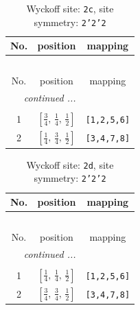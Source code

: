 \documentclass[fleqn,8pt]{jsarticle}
\begin{document}
\renewcommand{\arraystretch}{1.2}
\begin{longtable}{ccc}
\caption{Wyckoff site: {\tt 2c}, site symmetry: {\tt 2'2'2}}
 \\
 \hline \hline
No. & position & mapping \\ \hline \endfirsthead

\multicolumn{2}{l}{\tablename\ \thetable{}} \\
 \hline \hline
No. & position & mapping \\ \hline \endhead

 \hline \hline
\multicolumn{2}{r}{\footnotesize\it continued ...} \\ \endfoot

 \hline \hline
\multicolumn{2}{r}{} \\ \endlastfoot

1 & $\left[ \frac{3}{4},\, \frac{1}{4},\, \frac{1}{2} \right]$ & {\tt [1,2,5,6]} \\ \hline
2 & $\left[ \frac{1}{4},\, \frac{3}{4},\, \frac{1}{2} \right]$ & {\tt [3,4,7,8]} \\
\end{longtable}
\renewcommand{\arraystretch}{1.2}
\begin{longtable}{ccc}
\caption{Wyckoff site: {\tt 2d}, site symmetry: {\tt 2'2'2}}
 \\
 \hline \hline
No. & position & mapping \\ \hline \endfirsthead

\multicolumn{2}{l}{\tablename\ \thetable{}} \\
 \hline \hline
No. & position & mapping \\ \hline \endhead

 \hline \hline
\multicolumn{2}{r}{\footnotesize\it continued ...} \\ \endfoot

 \hline \hline
\multicolumn{2}{r}{} \\ \endlastfoot

1 & $\left[ \frac{1}{4},\, \frac{1}{4},\, \frac{1}{2} \right]$ & {\tt [1,2,5,6]} \\ \hline
2 & $\left[ \frac{3}{4},\, \frac{3}{4},\, \frac{1}{2} \right]$ & {\tt [3,4,7,8]} \\
\end{longtable}
\renewcommand{\arraystretch}{1.2}
\end{document}
